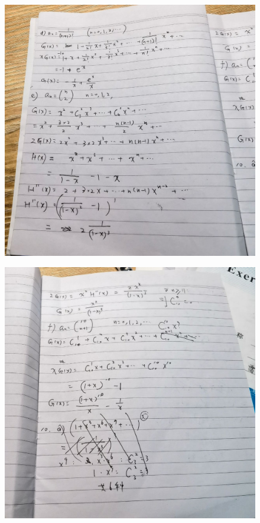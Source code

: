 \documentclass{article}
\begin{document}
   
    \begin{figure}[H]
    \centering
    \includegraphics[width=1\textwidth]{IMG_20221205_183628.jpg}
    \caption{\label{Lab9}}
    \end{figure}

  
    \begin{figure}[H]
    \centering
    \includegraphics[width=1\textwidth]{IMG_20221205_183631.jpg}
    \caption{\label{Lab9}}
    \end{figure}
\end{document}
